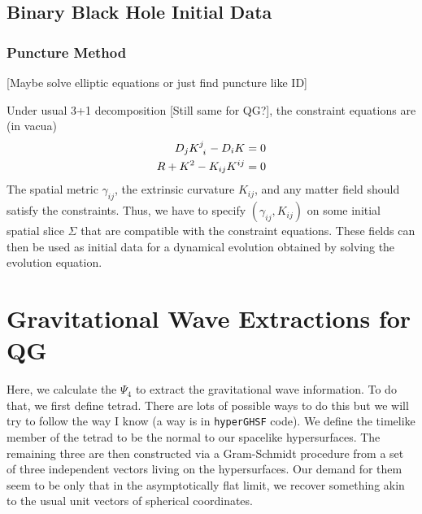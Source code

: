 \documentclass[a4paper,oneside,openany,11pt]{memoir}
\numberwithin{equation}{section} %
\newcommand{\NOTE}[1]{{\color{blue}[#1]}}
\begin{document}
\subsection{Binary Black Hole Initial Data}


\subsubsection{Puncture Method}

\NOTE{Maybe solve elliptic equations or just find puncture like ID}

Under usual 3+1 decomposition \NOTE{Still same for QG?}, the constraint equations are (in vacua)
\begin{align}
D_j K\indices{^j_i} - D_i K &= 0 \\
R + K^2 - K_{ij} K^{ij} &= 0
\end{align}
The spatial metric $\gamma_{ij}$, the extrinsic curvature $K_{ij}$, and any matter field should 
satisfy the constraints. Thus, we have to specify $(\gamma_{ij}, K_{ij})$ on some initial 
spatial slice $\Sigma$ that are compatible with the constraint equations. These fields can 
then be used as initial data for a dynamical evolution obtained by solving the evolution equation.


\section{Gravitational Wave Extractions for QG}
Here, we calculate the $\Psi_4$ to extract the gravitational wave information. To do that, we first define tetrad. 
There are lots of possible ways to do this but we will try to follow the way I know 
(a way is in \texttt{hyperGHSF} code). We define the timelike member of the tetrad to be the 
normal to our spacelike hypersurfaces. The remaining three are then constructed 
via a Gram-Schmidt procedure from a set of three independent vectors living on the 
hypersurfaces. Our demand for them seem to be only that in the asymptotically flat limit, 
we recover something akin to the usual unit vectors of spherical coordinates. 
\end{document}
